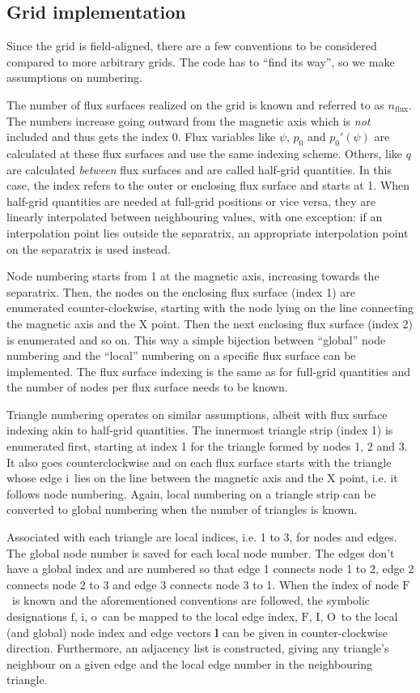 \documentclass[a4paper, twoside, 10pt, english]{article}
\numberwithin{equation}{section}
\let\vec\symbf
\newcommand*\fs{\ensuremath{\textrm{f}}}  %
\newcommand*\inw{\ensuremath{\textrm{i}}}  %
\newcommand*\out{\ensuremath{\textrm{o}}}  %
\newcommand*\vfs{\ensuremath{\textrm{F}}}  %
\newcommand*\vinw{\ensuremath{\textrm{I}}}  %
\newcommand*\vout{\ensuremath{\textrm{O}}}  %
\newcommand*\nflux{\ensuremath{n_{\text{flux}}}}  %
\begin{document}
\subsection{Grid implementation}
\label{sec:grid-impl}

Since the grid is field-aligned, there are a few conventions to be considered compared to more arbitrary grids. The code has to \enquote{find its way}, so we make assumptions on numbering.

The number of flux surfaces realized on the grid is known and referred to as \nflux. The numbers increase going outward from the magnetic axis which is \emph{not} included and thus gets the index 0. Flux variables like $\psi$, $p_{0}$ and $p_{0}' (\psi)$ are calculated at these flux surfaces and use the same indexing scheme. Others, like $q$ are calculated \emph{between} flux surfaces and are called half-grid quantities. In this case, the index refers to the outer or enclosing flux surface and starts at 1. When half-grid quantities are needed at full-grid positions or vice versa, they are linearly interpolated between neighbouring values, with one exception: if an interpolation point lies outside the separatrix, an appropriate interpolation point on the separatrix is used instead.

Node numbering starts from 1 at the magnetic axis, increasing towards the separatrix. Then, the nodes on the enclosing flux surface (index 1) are enumerated counter-clockwise, starting with the node lying on the line connecting the magnetic axis and the X point. Then the next enclosing flux surface (index 2) is enumerated and so on. This way a simple bijection between \enquote{global} node numbering and the \enquote{local} numbering on a specific flux surface can be implemented. The flux surface indexing is the same as for full-grid quantities and the number of nodes per flux surface needs to be known.

Triangle numbering operates on similar assumptions, albeit with flux surface indexing akin to half-grid quantities. The innermost triangle strip (index 1) is enumerated first, starting at index 1 for the triangle formed by nodes 1, 2 and 3. It also goes counterclockwise and on each flux surface starts with the triangle whose edge \inw\ lies on the line between the magnetic axis and the X point, i.e. it follows node numbering. Again, local numbering on a triangle strip can be converted to global numbering when the number of triangles is known.

Associated with each triangle are local indices, i.e. 1 to 3, for nodes and edges. The global node number is saved for each local node number. The edges don't have a global index and are numbered so that edge 1 connects node 1 to 2, edge 2 connects node 2 to 3 and edge 3 connects node 3 to 1. When the index of node \vfs\ is known and the aforementioned conventions are followed, the symbolic designations \fs, \inw, \out\ can be mapped to the local edge index, \vfs, \vinw, \vout\ to the local (and global) node index and edge vectors $\vec{l}$ can be given in counter-clockwise direction. Furthermore, an adjacency list is constructed, giving any triangle's neighbour on a given edge and the local edge number in the neighbouring triangle.
\end{document}
